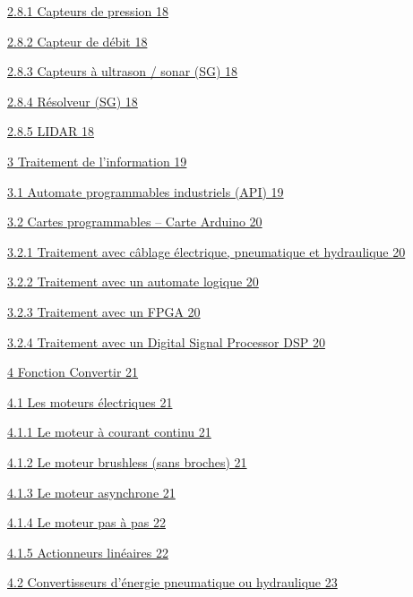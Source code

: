 \documentclass[
]{article}
\begin{document}
\protect\hyperlink{capteurs-de-pression}{2.8.1 Capteurs de pression 18}

\protect\hyperlink{capteur-de-duxe9bit}{2.8.2 Capteur de débit 18}

\protect\hyperlink{capteurs-uxe0-ultrason-sonar-sg}{2.8.3 Capteurs à
ultrason / sonar (SG) 18}

\protect\hyperlink{ruxe9solveur-sg}{2.8.4 Résolveur (SG) 18}

\protect\hyperlink{lidar}{2.8.5 LIDAR 18}

\protect\hyperlink{traitement-de-linformation}{3 Traitement de
l'information 19}

\protect\hyperlink{automate-programmables-industriels-api}{3.1 Automate
programmables industriels (API) 19}

\protect\hyperlink{cartes-programmables-carte-arduino}{3.2 Cartes
programmables -- Carte Arduino 20}

\protect\hyperlink{traitement-avec-cuxe2blage-uxe9lectrique-pneumatique-et-hydraulique}{3.2.1
Traitement avec câblage électrique, pneumatique et hydraulique 20}

\protect\hyperlink{traitement-avec-un-automate-logique}{3.2.2 Traitement
avec un automate logique 20}

\protect\hyperlink{traitement-avec-un-fpga}{3.2.3 Traitement avec un
FPGA 20}

\protect\hyperlink{traitement-avec-un-digital-signal-processor-dsp}{3.2.4
Traitement avec un Digital Signal Processor DSP 20}

\protect\hyperlink{fonction-convertir}{4 Fonction Convertir 21}

\protect\hyperlink{les-moteurs-uxe9lectriques}{4.1 Les moteurs
électriques 21}

\protect\hyperlink{le-moteur-uxe0-courant-continu}{4.1.1 Le moteur à
courant continu 21}

\protect\hyperlink{le-moteur-brushless-sans-broches}{4.1.2 Le moteur
brushless (sans broches) 21}

\protect\hyperlink{le-moteur-asynchrone}{4.1.3 Le moteur asynchrone 21}

\protect\hyperlink{le-moteur-pas-uxe0-pas}{4.1.4 Le moteur pas à pas 22}

\protect\hyperlink{actionneurs-linuxe9aires}{4.1.5 Actionneurs linéaires
22}

\protect\hyperlink{convertisseurs-duxe9nergie-pneumatique-ou-hydraulique}{4.2
Convertisseurs d'énergie pneumatique ou hydraulique 23}
\end{document}
